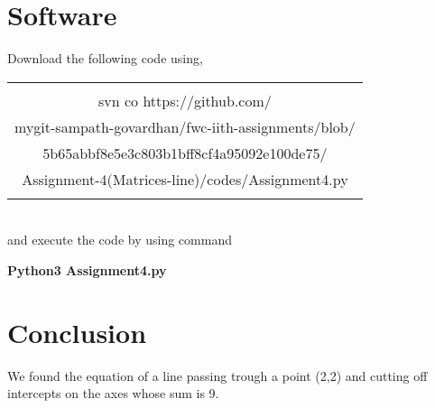 \documentclass[journal,12pt,twocolumn]{IEEEtran}
\begin{document}
\section{Software}
Download the following code using,
\begin{table}[h]
    \centering
    \begin{tabular}{|c|}
    \hline \\
         svn co https://github.com/\\mygit-sampath-govardhan/fwc-iith-assignments/blob/\\5b65abbf8e5e3c803b1bff8cf4a95092e100de75/\\Assignment-4(Matrices-line)/codes/Assignment4.py  \\
         \\
\hline
    \end{tabular}
\end{table}
\\
and execute the code by using command
\begin{center}
\textbf{Python3  Assignment4.py}\\
\end{center}

\section{Conclusion}
We found the equation of a line passing trough a point
(2,2) and cutting off intercepts on the axes whose
sum is 9.
\end{document}
